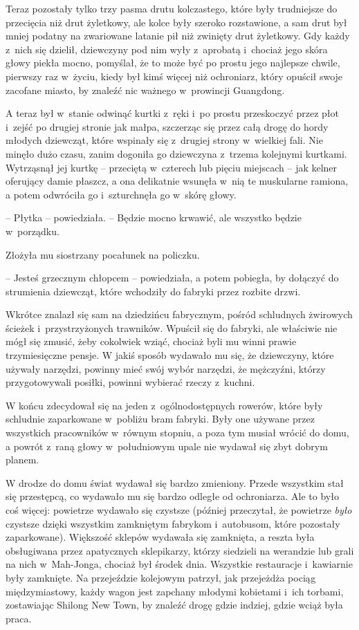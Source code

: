 \documentclass[oneside,polish,11pt,rmheadings]{mwbk}
\begin{document}
Teraz pozostały tylko trzy pasma drutu kolczastego, które były trudniejsze do przecięcia niż drut żyletkowy, ale kolce były szeroko rozstawione, a sam drut był mniej podatny na zwariowane latanie pił niż zwinięty drut żyletkowy. Gdy każdy z~nich się dzielił, dziewczyny pod nim wyły z~aprobatą i~chociaż jego skóra głowy piekła mocno, pomyślał, że to może być po prostu jego najlepsze chwile, pierwszy raz w~życiu, kiedy był kimś więcej niż ochroniarz, który opuścił swoje zacofane miasto, by znaleźć nic ważnego w~prowincji Guangdong. 


A teraz był w~stanie odwinąć kurtki z~ręki i~po prostu przeskoczyć przez płot i~zejść po drugiej stronie jak małpa, szczerząc się przez całą drogę do hordy młodych dziewcząt, które wspinały się z~drugiej strony w~wielkiej fali. Nie minęło dużo czasu, zanim dogoniła go dziewczyna z~trzema kolejnymi kurtkami. Wytrząsnął jej kurtkę -- przeciętą w~czterech lub pięciu miejscach -- jak kelner oferujący damie płaszcz, a ona delikatnie wsunęła w~nią te muskularne ramiona, a potem odwróciła go i~szturchnęła go w~skórę głowy. 


-- Płytka -- powiedziała. -- Będzie mocno krwawić, ale wszystko będzie w~porządku. 

Złożyła mu siostrzany pocałunek na policzku. 

-- Jesteś grzecznym chłopcem -- powiedziała, a potem pobiegła, by dołączyć do strumienia dziewcząt, które wchodziły do fabryki przez rozbite drzwi. 


Wkrótce znalazł się sam na dziedzińcu fabrycznym, pośród schludnych żwirowych ścieżek i~przystrzyżonych trawników. Wpuścił się do fabryki, ale właściwie nie mógł się zmusić, żeby cokolwiek wziąć, chociaż byli mu winni prawie trzymiesięczne pensje. W jakiś sposób wydawało mu się, że dziewczyny, które używały narzędzi, powinny mieć swój wybór narzędzi, że mężczyźni, którzy przygotowywali posiłki, powinni wybierać rzeczy z~kuchni. 


W końcu zdecydował się na jeden z~ogólnodostępnych rowerów, które były schludnie zaparkowane w~pobliżu bram fabryki. Były one używane przez wszystkich pracowników w~równym stopniu, a poza tym musiał wrócić do domu, a powrót z~raną głowy w~południowym upale nie wydawał się zbyt dobrym planem. 


W drodze do domu świat wydawał się bardzo zmieniony. Przede wszystkim stał się przestępcą, co wydawało mu się bardzo odległe od ochroniarza. Ale to było coś więcej: powietrze wydawało się czystsze (później przeczytał, że powietrze \textit{było }czystsze dzięki wszystkim zamkniętym fabrykom i~autobusom, które pozostały zaparkowane). Większość sklepów wydawała się zamknięta, a reszta była obsługiwana przez apatycznych sklepikarzy, którzy siedzieli na werandzie lub grali na nich w~Mah-Jonga, chociaż był środek dnia. Wszystkie restauracje i~kawiarnie były zamknięte. Na przejeździe kolejowym patrzył, jak przejeżdża pociąg międzymiastowy, każdy wagon jest zapchany młodymi kobietami i~ich torbami, zostawiając Shilong New Town, by znaleźć drogę gdzie indziej, gdzie wciąż była praca. 
\end{document}

